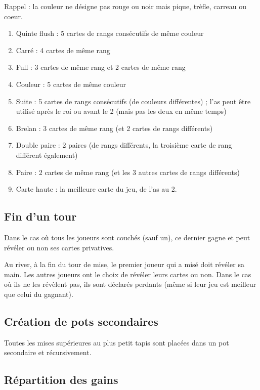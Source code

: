 \documentclass[a4paper]{article}
\begin{document}
Rappel : la couleur ne désigne pas rouge ou noir mais pique, trèfle, carreau ou coeur.

\begin{enumerate}
	\item Quinte flush : 5 cartes de rangs consécutifs de même couleur
	\item Carré : 4 cartes de même rang
	\item Full : 3 cartes de même rang et 2 cartes de même rang
	\item Couleur : 5 cartes de même couleur
	\item Suite : 5 cartes de rangs consécutifs (de couleurs différentes) ; l'as peut être utilisé après le roi ou avant le 2 (mais pas les deux en même temps)
	\item Brelan : 3 cartes de même rang (et 2 cartes de rangs différents)
	\item Double paire : 2 paires (de rangs différents, la troisième carte de rang différent également)
	\item Paire : 2 cartes de même rang (et les 3 autres cartes de rangs différents)
	\item Carte haute : la meilleure carte du jeu, de l'as au 2.
\end{enumerate}

\subsection{Fin d'un tour}

Dans le cas où tous les joueurs sont couchés (sauf un), ce dernier gagne et peut révéler ou non ses cartes privatives.

Au river, à la fin du tour de mise, le premier joueur qui a misé doit révéler sa main.
Les autres joueurs ont le choix de révéler leurs cartes ou non.
Dans le cas où ils ne les révèlent pas, ils sont déclarés perdants (même si leur jeu est meilleur que celui du gagnant).

\subsection{Création de pots secondaires}

Toutes les mises supérieures au plus petit tapis sont placées dans un pot secondaire et récursivement.

\subsection{Répartition des gains}
\end{document}
